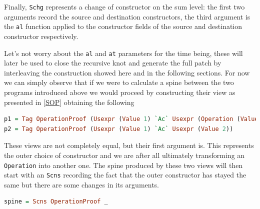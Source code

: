 \documentclass[11pt]{article}
\begin{document}
Finally, \texttt{Schg} represents a change of constructor on the sum level: the first two arguments record the
source and destination constructors, the third argument is the
\texttt{al} function applied to the constructor fields of the source and
destination constructor respectively.

Let's not worry about the \texttt{al} and \texttt{at} parameters for the time 
being, these will later be used to close the recursive knot and generate the full patch by interleaving
the construction showed here and in the following sections. 
For now we can simply observe that if we were to calculate a spine between the 
two programs introduced above we would proceed by constructing their view as 
presented in \ref{SOP} obtaining the following

\begin{lstlisting}[language=haskell]
p1 = Tag OperationProof (Usexpr (Value 1) `Ac` Usexpr (Operation (Value 1) (Value 1)))
p2 = Tag OperationProof (Usexpr (Value 1) `Ac` Usexpr (Value 2))
\end{lstlisting}

These views are not completely equal, but their first argument is. This represents the outer choice 
of constructor and we are after all ultimately transforming an \texttt{Operation} into another one. The spine produced
by these two views will then start with an \texttt{Scns} recording the fact that 
the outer constructor has stayed the same but there are some changes in its 
arguments.

\begin{lstlisting}[language=haskell]
spine = Scns OperationProof _
\end{lstlisting}
\end{document}
